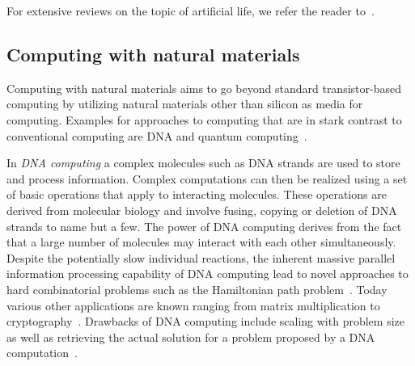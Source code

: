 		For extensive reviews on the topic of artificial life, we refer the reader to~\cite{Langton:1995:ALO:526815,Boden:1996:PAL:525139,bedau2000open,taylor1993artificial}.

		\FloatBarrier

	\subsection{Computing with natural materials}

		Computing with natural materials aims to go beyond standard transistor-based computing by utilizing natural materials other than silicon as media for computing. Examples for approaches to computing that are in stark contrast to conventional computing are DNA and quantum computing~\cite{de2007fundamentals}. 

		In \emph{DNA computing} a complex molecules such as DNA strands are used to store and process information. Complex computations can then be realized using a set of basic operations that apply to interacting molecules. These operations are derived from molecular biology and involve fusing, copying or deletion of DNA strands to name but a few. The power of DNA computing derives from the fact that a large number of molecules may interact with each other simultaneously. Despite the potentially slow individual reactions, the inherent massive parallel information processing capability of DNA computing lead to novel approaches to hard combinatorial problems such as the Hamiltonian path problem~\cite{adleman1994molecular}. Today various other applications are known ranging from matrix multiplication to cryptography~\cite{puaun2000computing,boneh1996computational,lipton1996breaking,oliver1998computation}. Drawbacks of DNA computing include scaling with problem size as well as retrieving the actual solution for a problem proposed by a DNA computation~\cite{de2007fundamentals}.

